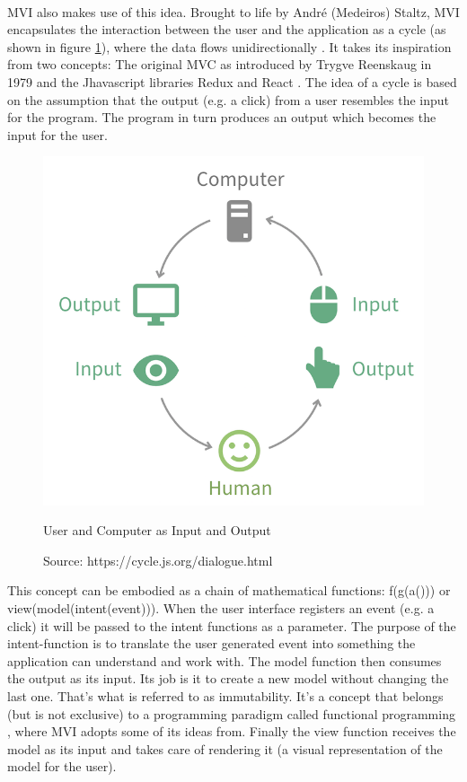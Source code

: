 \\
MVI also makes use of this idea. Brought to life by André (Medeiros) Staltz, MVI encapsulates the interaction between the user and the application as a cycle 
(as shown in figure 
\ref{fig:userComputerInputOutput}), 
where the data flows unidirectionally 
\cite{unidirectionalDataFlowRedux}.
It takes its inspiration from two concepts: The original MVC as introduced by Trygve Reenskaug in 1979 
\cite{wikipediaTrygveReenskaug} 
and the Jhavascript libraries Redux 
\cite{redux} 
and React 
\cite{react}. 
The idea of a cycle is based on the assumption that the output (e.g. a click) from a user resembles the input for the program. The program in turn produces an output 
which becomes the input for the user.
\begin{figure}[ht]
    \centering
    \includegraphics[height=0.5\textwidth]{./images/mvi-cycle}
    \caption{User and Computer as Input and Output}
    \caption*{Source: https://cycle.js.org/dialogue.html}
    \label{fig:userComputerInputOutput}
\end{figure}
This concept can be embodied as a chain of mathematical functions: f(g(a())) or view(model(intent(event))).
When the user interface registers an event (e.g. a click) it will be passed to the intent functions as a parameter. 
The purpose of the intent-function is to translate the user generated event into something the application can understand and work with.
The model function then consumes the output as its input. Its job is it to create a new model without changing the last one. That's what is referred to as immutability. 
\cite{immutableObjectsEffectiveJava}
It's a concept that belongs (but is not exclusive) to a programming paradigm called functional programming
\cite{functionalProgrammingWikiHaskell,functionalProgrammingPractical,programmingInHaskellFunctionalProgrammingDefinition},
where MVI adopts some of its ideas from.
Finally the view function receives the model as its input and takes care of rendering it (a visual representation of the model for the user). 
